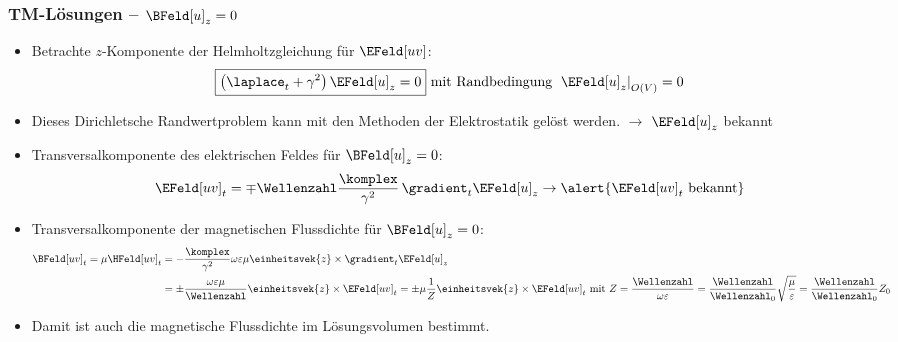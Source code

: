 \begin{frame}
  \frametitle{TM-Lösungen -- \(\BFeld[u]_z = 0\)}
  \begin{itemize}[<+->]
  \item Betrachte \(z\)-Komponente der Helmholtzgleichung für \(\EFeld[uv]\):
    \begin{equation*}
      \boxed{\left(\laplace_t + \gamma^2\right) \EFeld[u]_z =  0} \text{ mit Randbedingung } \left. \EFeld[u]_z\right|_{O(V)} = 0 
    \end{equation*}
  \item Dieses \alert{Dirichletsche Randwertproblem} kann mit den Methoden der Elektrostatik gelöst werden. \(\to\) \alert{\(\EFeld[u]_z\) bekannt}
  \item Transversalkomponente des elektrischen Feldes für \(\BFeld[u]_z = 0\):
    \begin{equation*}
      \EFeld[uv]_t =  \mp \Wellenzahl \frac{\komplex}{\gamma^2} \, \gradient_t \EFeld[u]_{z}  \to \alert{\EFeld[uv]_t \text{ bekannt}}  
      \end{equation*}
  \item Transversalkomponente der magnetischen Flussdichte für \(\BFeld[u]_z = 0\):
       \begin{align*}
         \BFeld[uv]_t = \mu\HFeld[uv]_t&= -\frac{\komplex}{\gamma^2} \omega\varepsilon\mu  \einheitsvek{z}\times\gradient_t \EFeld[u]_{z}\\
         &= \pm \frac{\omega\varepsilon\mu}{\Wellenzahl} \einheitsvek{z}\times \EFeld[uv]_{t} = \pm \mu \frac{1}{Z} \einheitsvek{z}\times \EFeld[uv]_{t} \text{ mit } Z=\frac{\Wellenzahl}{\omega\varepsilon} = \frac{\Wellenzahl}{\Wellenzahl_0}\sqrt{\frac{\mu}{\varepsilon}} = \frac{\Wellenzahl}{\Wellenzahl_0} Z_0 
       \end{align*}
       \item Damit ist auch die \alert{magnetische Flussdichte im Lösungsvolumen bestimmt}. 
       \end{itemize}
       \ 
\end{frame}


